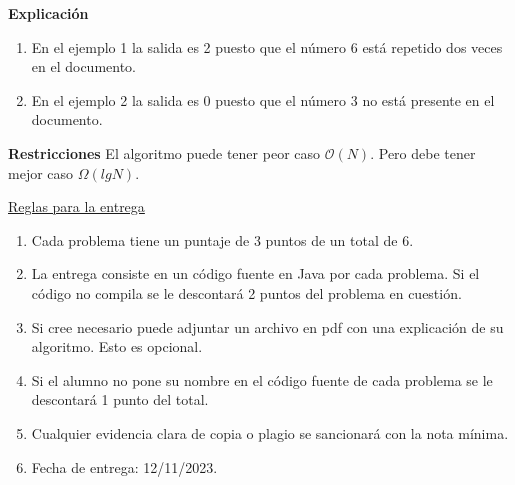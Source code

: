 \documentclass[12pt]{exam}
\begin{document}
\noindent{}%
\hfill%

\begin{flushleft}
\vspace{0.25cm}
\textbf{Explicación}
\begin{enumerate}
    \item En el ejemplo 1 la salida es 2 puesto que el número 6 está repetido dos veces en el documento.
    \item En el ejemplo 2 la salida es 0 puesto que el número 3 no está presente en el documento.
\end{enumerate}
\textbf{Restricciones}
\newline 
El algoritmo puede tener peor caso $\mathcal{O}(N)$. Pero debe tener mejor caso $\Omega(lg N)$.
\end{flushleft}

\newpage

\underline{Reglas para la entrega}

\begin{enumerate}
    \item Cada problema tiene un puntaje de 3 puntos de un total de 6.
    \item La entrega consiste en un código fuente en Java por cada problema. Si el código no compila se le descontará 2 puntos del problema en cuestión.
    \item Si cree necesario puede adjuntar un archivo en pdf con una explicación de su algoritmo. Esto es opcional.
    \item Si el alumno no pone su nombre en el código fuente de cada problema se le descontará 1 punto del total.
    \item Cualquier evidencia clara de copia o plagio se sancionará con la nota mínima.
    \item Fecha de entrega: 12/11/2023.
\end{enumerate}
\end{document}
